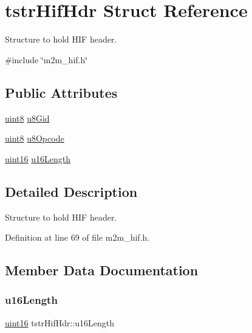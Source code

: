 \hypertarget{structtstrHifHdr}{}\section{tstr\+Hif\+Hdr Struct Reference}
\label{structtstrHifHdr}


Structure to hold H\+IF header.  




{\ttfamily \#include \char`\"{}m2m\+\_\+hif.\+h\char`\"{}}

\subsection*{Public Attributes}
\begin{DoxyCompactItemize}
\item 
\hyperlink{group__DataT_ga4df709a77647e870bbf1d955b8edc9a6}{uint8} \hyperlink{structtstrHifHdr_a7a12aaca5b72583aa35959eba923e466}{u8\+Gid}
\item 
\hyperlink{group__DataT_ga4df709a77647e870bbf1d955b8edc9a6}{uint8} \hyperlink{structtstrHifHdr_a95b0cece0166052ed10341584a2bda3f}{u8\+Opcode}
\item 
\hyperlink{group__DataT_ga1daa745171fc6e31d942c161422a76f9}{uint16} \hyperlink{structtstrHifHdr_a3f30ba8842ea1373d6c1514524704e09}{u16\+Length}
\end{DoxyCompactItemize}


\subsection{Detailed Description}
Structure to hold H\+IF header. 

Definition at line 69 of file m2m\+\_\+hif.\+h.



\subsection{Member Data Documentation}
\mbox{\label{structtstrHifHdr_a3f30ba8842ea1373d6c1514524704e09}} 
\subsubsection{\texorpdfstring{u16\+Length}{u16Length}}
{\footnotesize\ttfamily \hyperlink{group__DataT_ga1daa745171fc6e31d942c161422a76f9}{uint16} tstr\+Hif\+Hdr\+::u16\+Length}

